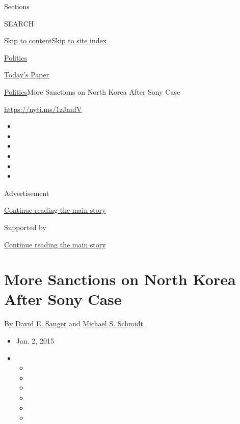 Sections

SEARCH

\protect\hyperlink{site-content}{Skip to
content}\protect\hyperlink{site-index}{Skip to site index}

\href{https://www.nytimes.com/section/politics}{Politics}

\href{https://myaccount.nytimes.com/auth/login?response_type=cookie\&client_id=vi}{}

\href{https://www.nytimes.com/section/todayspaper}{Today's Paper}

\href{/section/politics}{Politics}\textbar{}More Sanctions on North
Korea After Sony Case

\url{https://nyti.ms/1zJnnfV}

\begin{itemize}
\item
\item
\item
\item
\item
\item
\end{itemize}

Advertisement

\protect\hyperlink{after-top}{Continue reading the main story}

Supported by

\protect\hyperlink{after-sponsor}{Continue reading the main story}

\hypertarget{more-sanctions-on-north-korea-after-sony-case}{%
\section{More Sanctions on North Korea After Sony
Case}\label{more-sanctions-on-north-korea-after-sony-case}}

By \href{http://www.nytimes.com/by/david-e-sanger}{David E. Sanger} and
\href{http://www.nytimes.com/by/michael-s-schmidt}{Michael S. Schmidt}

\begin{itemize}
\item
  Jan. 2, 2015
\item
  \begin{itemize}
  \item
  \item
  \item
  \item
  \item
  \item
  \end{itemize}
\end{itemize}

